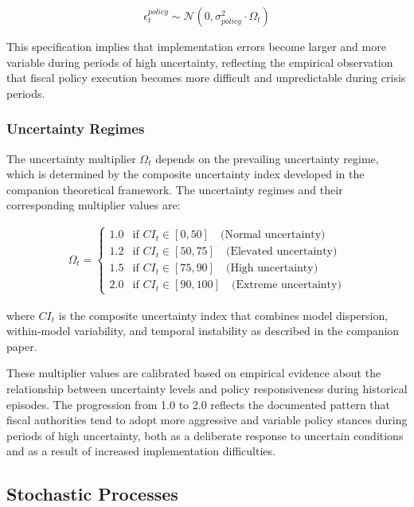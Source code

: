 \documentclass[5p,authoryear]{elsarticle}
\begin{document}
\begin{equation}
\epsilon_t^{policy} \sim \mathcal{N}(0, \sigma_{policy}^2 \cdot \Omega_t)
\label{eq:policy_error}
\end{equation}

This specification implies that implementation errors become larger and more variable during periods of high uncertainty, reflecting the empirical observation that fiscal policy execution becomes more difficult and unpredictable during crisis periods.

\subsubsection{Uncertainty Regimes}

The uncertainty multiplier $\Omega_t$ depends on the prevailing uncertainty regime, which is determined by the composite uncertainty index developed in the companion theoretical framework. The uncertainty regimes and their corresponding multiplier values are:

\begin{align}
\Omega_t = \begin{cases}
1.0 & \text{if } CI_t \in [0, 50] \quad \text{(Normal uncertainty)} \\
1.2 & \text{if } CI_t \in [50, 75] \quad \text{(Elevated uncertainty)} \\
1.5 & \text{if } CI_t \in [75, 90] \quad \text{(High uncertainty)} \\
2.0 & \text{if } CI_t \in [90, 100] \quad \text{(Extreme uncertainty)}
\end{cases}
\label{eq:uncertainty_regimes}
\end{align}

where $CI_t$ is the composite uncertainty index that combines model dispersion, within-model variability, and temporal instability as described in the companion paper.

These multiplier values are calibrated based on empirical evidence about the relationship between uncertainty levels and policy responsiveness during historical episodes. The progression from 1.0 to 2.0 reflects the documented pattern that fiscal authorities tend to adopt more aggressive and variable policy stances during periods of high uncertainty, both as a deliberate response to uncertain conditions and as a result of increased implementation difficulties.

\subsection{Stochastic Processes}
\end{document}

